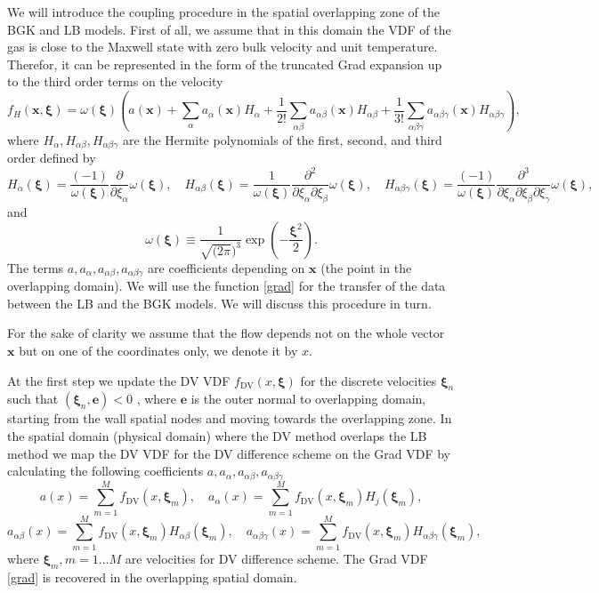\documentclass[]{elsarticle} %
\newcommand{\bxi}{\boldsymbol{\xi}}
\newcommand{\bx}{\boldsymbol{x}}
\begin{document}
{We will introduce the coupling procedure in the spatial overlapping zone of the BGK and LB models.
First of all, we assume that in this domain the VDF of the gas is close to the Maxwell state with zero bulk velocity and unit temperature.
Therefor, it can be represented in the form of the truncated Grad expansion up to the third order terms on the velocity
\begin{equation}\label{grad}
    f_H(\bx,\bxi) = \omega(\bxi)\left(a(\bx) +\sum_{\alpha}a_{\alpha}(\bx)H_{\alpha}+\frac{1}{2!}\sum_{\alpha\beta}a_{\alpha \beta}(\bx)H_{\alpha\beta}+\frac{1}{3!}\sum_{\alpha\beta \gamma}a_{\alpha\beta\gamma}(\bx)H_{\alpha\beta\gamma}\right),
\end{equation}
where $H_{\alpha}, H_{\alpha\beta}, H_{\alpha\beta\gamma}$ are the Hermite polynomials of the first, second, and third order defined by
$$
H_\alpha(\bxi)=\frac{(-1)}{\omega(\bxi)}\frac{\partial}{\partial \xi_\alpha}\omega(\bxi),  \quad H_{\alpha\beta}(\bxi)=\frac{1}{\omega(\bxi)}\frac{\partial^2}{\partial \xi_\alpha\partial \xi_\beta}\omega(\bxi),
\quad H_{\alpha\beta \gamma}(\bxi)=\frac{(-1)}{\omega(\bxi)}\frac{\partial^3}{\partial \xi_\alpha\partial \xi_\beta \partial \xi_\gamma}\omega(\bxi),
$$
and
$$
 \omega(\bxi)\equiv \frac{1}{\sqrt{(2\pi})^3}\exp\left(-\frac{\bxi^2}{2}\right).
$$
 The terms $a, a_{\alpha},a_{\alpha\beta}, a_{\alpha\beta \gamma}$ are coefficients depending on $\bx$ (the point in the overlapping domain).
 We will use the function \eqref{grad} for the transfer of the data between the LB and the BGK models. We will discuss this procedure in turn.

For the sake of clarity we assume that the flow depends not on the whole vector $\bx$ but on one of the coordinates only, we denote it by $x$.

At the first step we update the DV VDF $f_\mathrm{DV}(x,\bxi)$ for the discrete velocities $\bxi_n$ such that $(\bxi_n,\mathbf{e})<0$ , where $\mathbf{e}$ is the outer normal to overlapping domain,  starting from the wall spatial nodes and moving towards the overlapping zone.
In the spatial domain (physical domain) where the DV method overlaps the LB method we map the DV VDF for the DV difference scheme on the Grad VDF by calculating the following coefficients $a, a_\alpha,a_{\alpha\beta}, a_{\alpha\beta \gamma}$
$$
a(x)=\sum_{m=1}^M f_\mathrm{DV}(x,\bxi_m),   \quad a_\alpha(x)=\sum_{m=1}^Mf_\mathrm{DV}(x,\bxi_m)H_j(\bxi_m),
$$
$$
a_{\alpha\beta }(x)=\sum_{m=1}^Mf_\mathrm{DV}(x,\bxi_m)H_{\alpha\beta}(\bxi_m), \quad
a_{\alpha\beta \gamma}(x)=\sum_{m=1}^Mf_\mathrm{DV}(x,\bxi_m)H_{\alpha\beta \gamma}(\bxi_m),
$$
where $\bxi_m, m=1 \ldots M$ are velocities for DV difference scheme.
The Grad VDF \eqref{grad} is recovered in the overlapping spatial domain.

}
\end{document}
